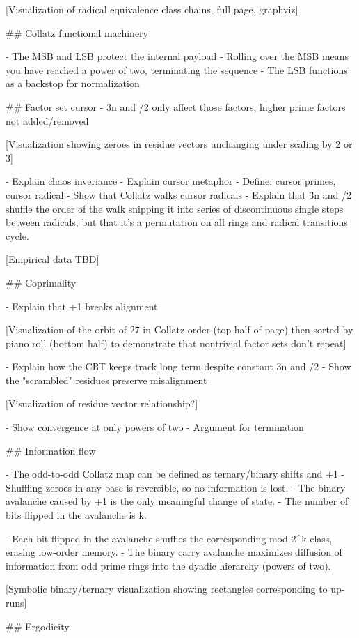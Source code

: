 \documentclass[12pt]{article}
\theoremstyle{plain}
\theoremstyle{definition}
\begin{document}
[Visualization of radical equivalence class chains, full page, graphviz]

## Collatz functional machinery

- The MSB and LSB protect the internal payload
- Rolling over the MSB means you have reached a power of two, terminating the sequence
- The LSB functions as a backstop for normalization

## Factor set cursor
- 3n and /2 only affect those factors, higher prime factors not added/removed

[Visualization showing zeroes in residue vectors unchanging under scaling by 2 or 3]

- Explain chaos inveriance
- Explain cursor metaphor
- Define: cursor primes, cursor radical
- Show that Collatz walks cursor radicals
- Explain that 3n and /2 shuffle the order of the walk snipping it into series of discontinuous single steps between radicals, but that it's a permutation on all rings and radical transitions cycle.

[Empirical data TBD]

## Coprimality

- Explain that +1 breaks alignment

[Visualization of the orbit of 27 in Collatz order (top half of page) then sorted by piano roll (bottom half) to demonstrate that nontrivial factor sets don't repeat]

- Explain how the CRT keeps track long term despite constant 3n and /2
- Show the "scrambled" residues preserve misalignment

[Visualization of residue vector relationship?]

- Show convergence at only powers of two
- Argument for termination

## Information flow

- The odd-to-odd Collatz map can be defined as ternary/binary shifts and +1
- Shuffling zeroes in any base is reversible, so no information is lost.
- The binary avalanche caused by +1 is the only meaningful change of state.
- The number of bits flipped in the avalanche is k.

- Each bit flipped in the avalanche shuffles the corresponding mod 2^k class, erasing low-order memory.
- The binary carry avalanche maximizes diffusion of information from odd prime rings into the dyadic hierarchy (powers of two).

[Symbolic binary/ternary visualization showing rectangles corresponding to up-runs]

## Ergodicity
\end{document}
